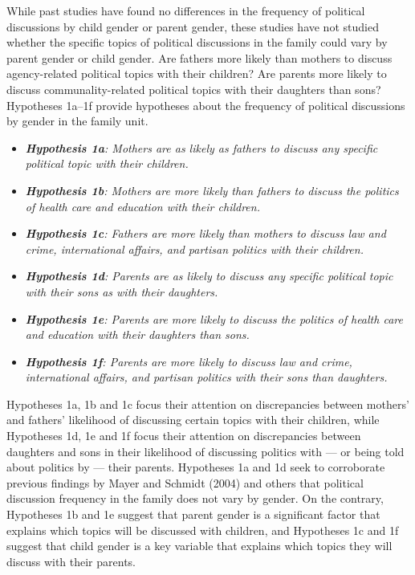 \documentclass[
  letterpaper,
  DIV=11,
  numbers=noendperiod]{scrreprt}
\begin{document}
While past studies have found no differences in the frequency of
political discussions by child gender or parent gender, these studies
have not studied whether the specific topics of political discussions in
the family could vary by parent gender or child gender. Are fathers more
likely than mothers to discuss agency-related political topics with
their children? Are parents more likely to discuss communality-related
political topics with their daughters than sons? Hypotheses 1a--1f
provide hypotheses about the frequency of political discussions by
gender in the family unit.

\begin{itemize}
\item
  \emph{\textbf{Hypothesis 1a}: Mothers are as likely as fathers to
  discuss any specific political topic with their children.}
\item
  \emph{\textbf{Hypothesis 1b}: Mothers are more likely than fathers to
  discuss the politics of health care and education with their
  children.}
\item
  \emph{\textbf{Hypothesis 1c}: Fathers are more likely than mothers to
  discuss law and crime, international affairs, and partisan politics
  with their children.}
\item
  \emph{\textbf{Hypothesis 1d}: Parents are as likely to discuss any
  specific political topic with their sons as with their daughters.}
\item
  \emph{\textbf{Hypothesis 1e}: Parents are more likely to discuss the
  politics of health care and education with their daughters than sons.}
\item
  \emph{\textbf{Hypothesis 1f}: Parents are more likely to discuss law
  and crime, international affairs, and partisan politics with their
  sons than daughters.}
\end{itemize}

Hypotheses 1a, 1b and 1c focus their attention on discrepancies between
mothers' and fathers' likelihood of discussing certain topics with their
children, while Hypotheses 1d, 1e and 1f focus their attention on
discrepancies between daughters and sons in their likelihood of
discussing politics with --- or being told about politics by --- their
parents. Hypotheses 1a and 1d seek to corroborate previous findings by
Mayer and Schmidt (2004) and others that political discussion frequency
in the family does not vary by gender. On the contrary, Hypotheses 1b
and 1e suggest that parent gender is a significant factor that explains
which topics will be discussed with children, and Hypotheses 1c and 1f
suggest that child gender is a key variable that explains which topics
they will discuss with their parents.
\end{document}
